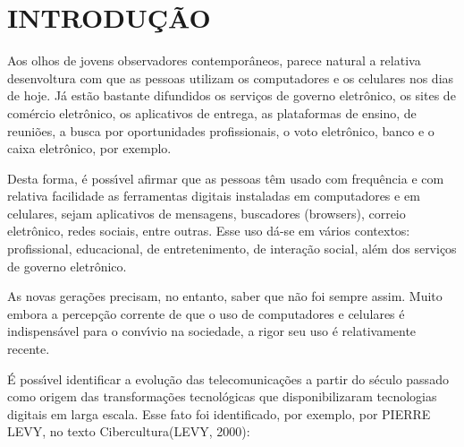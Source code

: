 \documentclass[
12pt,		%
openright,	%
twoside,  %
a4paper,			%
chapter=TITLE,		%
english,			%
french,				%
spanish,			%
brazil				%
]{USPSC-classe/USPSC_RedarTex}
\begin{document}
\chapter[INTRODU\c{C}\~AO]{INTRODU\c{C}\~AO}\label{INTRODU\c{C}\~AO}
Aos olhos de jovens observadores contempor\^aneos, parece natural a relativa desenvoltura com que as pessoas utilizam os computadores e os celulares nos dias de hoje. J\'a est\~ao bastante difundidos os servi\c{c}os de governo eletr\^onico, os sites de com\'ercio eletr\^onico, os  aplicativos de entrega, as plataformas de ensino, de reuni\~oes, a busca por oportunidades profissionais, o voto eletr\^onico, banco e o caixa eletr\^onico, por exemplo.








Desta forma, \'e poss\'{\i}vel afirmar que as pessoas t\^em usado com frequ\^encia e com relativa facilidade as ferramentas digitais instaladas em computadores e em celulares, sejam aplicativos de mensagens, buscadores (browsers), correio eletr\^onico, redes sociais, entre outras. Esse uso d\'a-se em v\'arios contextos: profissional, educacional, de entretenimento, de intera\c{c}\~ao social, al\'em dos servi\c{c}os de governo eletr\^onico.








As novas gera\c{c}\~oes precisam, no entanto, saber que n\~ao foi sempre assim. Muito embora a percep\c{c}\~ao corrente de que o uso de computadores e celulares \'e indispens\'avel para o conv\'{\i}vio na sociedade, a rigor seu uso \'e relativamente recente.








\'E poss\'{\i}vel identificar a evolu\c{c}\~ao das telecomunica\c{c}\~oes a partir do s\'eculo passado como origem das transforma\c{c}\~oes tecnol\'ogicas que disponibilizaram tecnologias digitais em larga escala. Esse fato foi identificado, por exemplo, por PIERRE LEVY, no texto \textquotedbl Cibercultura\textquotedbl  (LEVY, 2000):









\noindent\begin{center}\mbox{\centering{}}\end{center}
\end{document}
